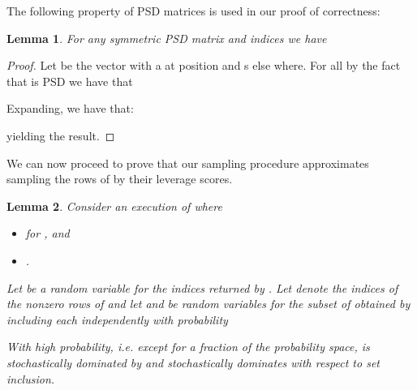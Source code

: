 \documentclass[11pt]{article}
\newtheorem{lemma}{Lemma}
\begin{document}
The following property of PSD matrices is used in our proof of correctness:
\begin{lemma}
\label{lem:gen:psd_fact}
For any symmetric PSD matrix  and indices  we have

\end{lemma}

\begin{proof}
Let  be the vector with a  at position  and s else where. For all  by the fact that  is PSD we have that

Expanding, we have that:

yielding the result.
\end{proof}

We can now proceed to prove that our sampling procedure approximates sampling the rows of  by their leverage scores.
\begin{lemma}\label{matrix_dominance} Consider an execution of  where
\begin{itemize}
  \item  for , and
  \item .
\end{itemize}
Let  be a random variable for the indices returned by . Let  denote the indices of the nonzero rows of  and let  and  be random variables for the subset of  obtained by including each  independently with probability

With high probability, i.e. except for a  fraction of the probability space,  is stochastically dominated by  and  stochastically dominates  with respect to set inclusion.
\end{lemma}
\end{document}
